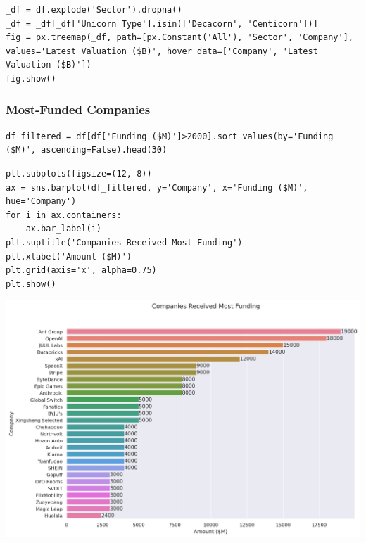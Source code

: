 \documentclass[a4paper,12pt]{article}
\begin{document}
\newpage

\begin{verbatim}
_df = df.explode('Sector').dropna()
_df = _df[_df['Unicorn Type'].isin(['Decacorn', 'Centicorn'])]
fig = px.treemap(_df, path=[px.Constant('All'), 'Sector', 'Company'], values='Latest Valuation ($B)', hover_data=['Company', 'Latest Valuation ($B)'])
fig.show()
\end{verbatim}
\subsubsection{Most-Funded Companies}
\label{sec:orgc99f9a0}

\begin{verbatim}
df_filtered = df[df['Funding ($M)']>2000].sort_values(by='Funding ($M)', ascending=False).head(30)
\end{verbatim}

\begin{verbatim}
plt.subplots(figsize=(12, 8))
ax = sns.barplot(df_filtered, y='Company', x='Funding ($M)', hue='Company')
for i in ax.containers:
    ax.bar_label(i)
plt.suptitle('Companies Received Most Funding')
plt.xlabel('Amount ($M)')
plt.grid(axis='x', alpha=0.75)
plt.show()
\end{verbatim}

\begin{center}
\includegraphics[width=.9\linewidth]{./.ob-jupyter/fb1eb3db2c42a7fcca21bbc7173378d3b82bc0f4.png}
\label{}
\end{center}
\end{document}
